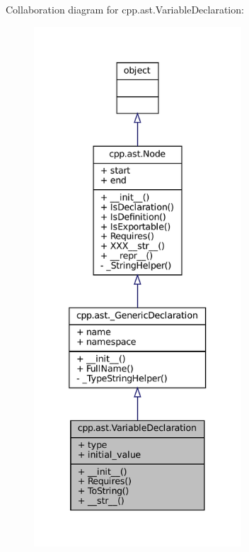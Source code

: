 Collaboration diagram for cpp.\+ast.\+Variable\+Declaration\+:
\nopagebreak
\begin{figure}[H]
\begin{center}
\leavevmode
\includegraphics[height=550pt]{classcpp_1_1ast_1_1VariableDeclaration__coll__graph}
\end{center}
\end{figure}
